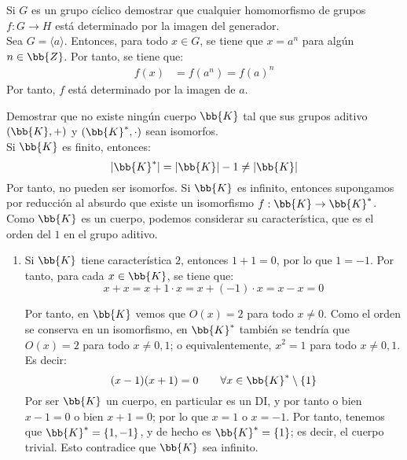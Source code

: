 \begin{ejercicio}\label{ej:2.38}
    Si $G$ es un grupo cíclico demostrar que cualquier homomorfismo de grupos $f : G \to H$ está determinado por la imagen del generador.\\

    Sea $G=\langle a\rangle$. Entonces, para todo $x\in G$, se tiene que $x=a^n$ para algún $n\in \bb{Z}$. Por tanto, se tiene que:
    \begin{align*}
        f(x)&=f(a^n)=f(a)^n
    \end{align*}
    Por tanto, $f$ está determinado por la imagen de $a$.
\end{ejercicio}

\begin{ejercicio}\label{ej:2.39}
    Demostrar que no existe ningún cuerpo $\bb{K}$ tal que sus grupos aditivo $(\bb{K}, +)$ y $(\bb{K}^{\ast}, \cdot)$ sean isomorfos.\\

    Si $\bb{K}$ es finito, entonces:
    \begin{equation*}
        |\bb{K}^*|=|\bb{K}|-1\neq |\bb{K}|
    \end{equation*}
    Por tanto, no pueden ser isomorfos. Si $\bb{K}$ es infinito, entonces supongamos por reducción al absurdo que existe un isomorfismo $f:\bb{K}\to \bb{K}^*$. Como $\bb{K}$ es un cuerpo, podemos considerar su característica, que es el orden del $1$ en el grupo aditivo.
    \begin{enumerate}
        \item Si $\bb{K}$ tiene característica $2$, entonces $1+1=0$, por lo que $1=-1$. Por tanto, para cada $x\in \bb{K}$, se tiene que:
        \begin{equation*}
            x+x=x+1\cdot x = x+(-1)\cdot x = x-x=0
        \end{equation*}

        Por tanto, en $\bb{K}$ vemos que $O(x)=2$ para todo $x\neq 0$. Como el orden se conserva en un isomorfismo, en $\bb{K}^*$ también se tendría que $O(x)=2$ para todo $x\neq 0,1$; o equivalentemente, $x^2=1$ para todo $x\neq 0,1$. Es decir:
        \begin{equation*}
            (x-1)(x+1)=0\qquad \forall x\in \bb{K}^*\setminus \{1\}
        \end{equation*}
        Por ser $\bb{K}$ un cuerpo, en particular es un DI, y por tanto o bien $x-1=0$ o bien $x+1=0$; por lo que $x=1$ o $x=-1$. Por tanto, tenemos que $\bb{K}^*=\{1,-1\}$, y de hecho es $\bb{K}^*=\{1\}$; es decir, el cuerpo trivial. Esto contradice que $\bb{K}$ sea infinito.


\end{enumerate}
\end{ejercicio}
